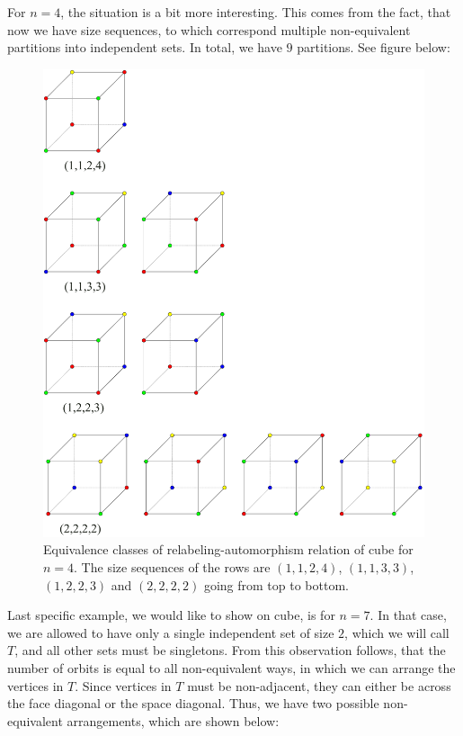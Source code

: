 For $n=4$, the situation is a bit more interesting. This comes from the fact, that now we have size sequences, to which correspond multiple non-equivalent partitions into independent sets. In total, we have $9$ partitions. See figure below:

\begin{figure}[H]
    \centering
    \includegraphics[width=1\textwidth]{Resources/Figs/cube_non_relaut-4-clrings.pdf}
    \caption{Equivalence classes of relabeling-automorphism relation of cube for $n=4$. The size sequences of the rows are $(1,1,2,4)$, $(1,1,3,3)$, $(1,2,2,3)$ and $(2,2,2,2)$ going from top to bottom.}
    \label{fig:cube-4clring-relaut-classes}
\end{figure}

Last specific example, we would like to show on cube, is for $n=7$. In that case, we are allowed to have only a single independent set of size $2$, which we will call $T$, and all other sets must be singletons. From this observation follows, that the number of orbits is equal to all non-equivalent ways, in which we can arrange the vertices in $T$. Since vertices in $T$ must be non-adjacent, they can either be across the face diagonal or the space diagonal. Thus, we have two possible non-equivalent arrangements, which are shown below:

